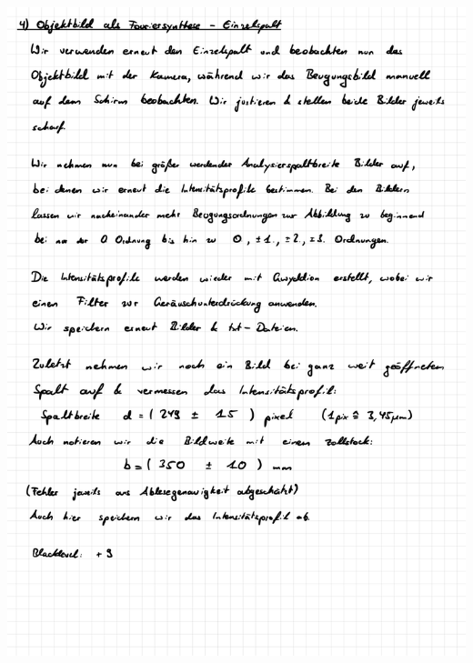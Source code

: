 \documentclass{article}
\begin{document}
\includegraphics[width=\textwidth]{graphics/messprotokoll/233 - Fourieroptik-10.jpg}
\newpage
\end{document}

